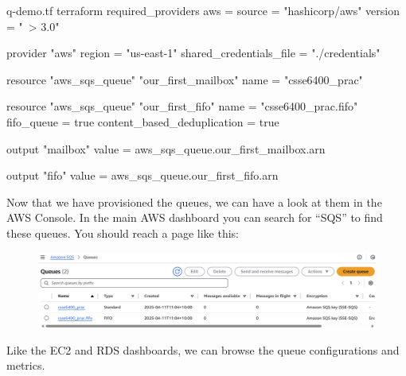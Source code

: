 \documentclass{csse4400}
\begin{document}

\begin{code}[language=terraform, numbers=none]{q-demo.tf}
terraform {
  required_providers {
    aws = {
      source = "hashicorp/aws"
      version = "~> 3.0"
    }
  }
}

provider "aws" {
  region = "us-east-1"
  shared_credentials_file = "./credentials"
}

resource "aws_sqs_queue" "our_first_mailbox" {
  name                        = "csse6400_prac"
}

resource "aws_sqs_queue" "our_first_fifo" {
  name                        = "csse6400_prac.fifo"
  fifo_queue                  = true
  content_based_deduplication = true
}

output "mailbox" {
  value = aws_sqs_queue.our_first_mailbox.arn
}

output "fifo" {
  value = aws_sqs_queue.our_first_fifo.arn
}
\end{code}

Now that we have provisioned the queues, we can have a look at them in the AWS Console.
In the main AWS dashboard you can search for ``SQS'' to find these queues.
You should reach a page like this:

\begin{figure}[H]
  \includegraphics[width=\textwidth]{images/sqspanel}
\end{figure}

Like the EC2 and RDS dashboards,
we can browse the queue configurations and metrics.
  
\end{document}

